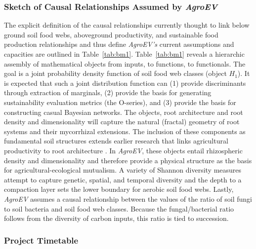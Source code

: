 \documentclass[12pt, letterpaper]{article}
\begin{document}
\subsubsection*{Sketch of Causal Relationships Assumed by \textit{AgroEV}}
The explicit definition of the causal relationships currently thought to link below ground soil food webs, aboveground productivity, and sustainable food production relationships and thus define \textit{AgroEV's} current assumptions and capacities are outlined in Table~\ref{tab:bm1}. Table~\ref{tab:bm1} reveals a hierarchic assembly of mathematical objects from inputs, to functions, to functionals. The goal is a joint probability density function of soil food web classes (object $H_1$). It is expected that such a joint distribution function can (1) provide discriminants through extraction of marginals, (2) provide the basis for generating sustainability evaluation metrics (the O-series), and (3) provide the basis for constructing casual Bayesian networks. The objects, root architecture and root density and dimensionality will capture the natural (fractal) geometry of root systems and their mycorrhizal extensions. The inclusion of these components as fundamental soil structures extends earlier research that links agricultural productivity to root architecture \citep{lynch_root_1995}.  In \textit{AgroEV}, these objects entail rhizospheric density and dimensionality and therefore provide a physical structure as the basis for agricultural-ecological mutualism. A variety of Shannon diversity measures attempt to capture genetic, spatial, and temporal diversity and the depth to a compaction layer sets the lower boundary for aerobic soil food webs. Lastly, \textit{AgroEV} assumes a causal relationship between the values of the ratio of soil fungi to soil bacteria and soil food web classes. Because the fungal/bacterial ratio follows from the diversity of carbon inputs, this ratio is tied to succession.

\subsubsection*{Project Timetable}
\end{document}
